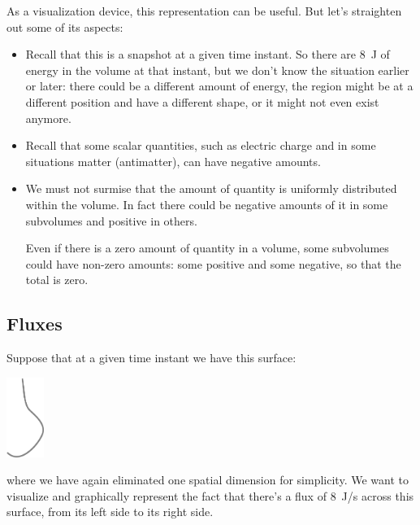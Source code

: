 \documentclass[a4paper,12pt,%
onecolumn,oneside,titlepage,%
british%
]{memoir}
\renewcommand*{\|}[1][]{\nonscript\:#1\vert\nonscript\:\mathopen{}}
\begin{document}
As a visualization device, this representation can be useful. But let's straighten out some of its aspects:
\begin{itemize}[para]
\item Recall that this is a snapshot at a given time instant. So there are \qty{8}{J} of energy in the volume at that instant, but we don't know the situation earlier or later: there could be a different amount of energy, the region might be at a different position and have a different shape, or it might not even exist anymore.

\item Recall that some scalar quantities, such as electric charge and in some situations matter (antimatter), can have negative amounts.

\item We must not surmise that the amount of quantity is uniformly distributed within the volume. In fact there could be negative amounts of it in some subvolumes and positive in others.
  \begin{warning}
   Even if there is a zero amount of quantity in a volume, some subvolumes could have non-zero amounts: some positive and some negative, so that the total is zero.
  \end{warning}

\end{itemize}

\subsection{Fluxes}

Suppose that at a given time instant we have this surface:
\begin{center}
  \includegraphics[height=7em]{fluxsurface.pdf}
\end{center}
where we have again eliminated one spatial dimension for simplicity. We want to visualize and graphically represent the fact that there's a flux of \textcolor{bluepurple}{\qty{8}{J/s}} across this surface, from its left side to its right side.
\end{document}
